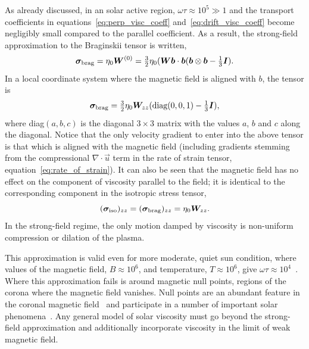 As already discussed, in an solar active region, $\omega \tau \approx 10^5 \gg 1$ and the transport coefficients in equations~\ref{eq:perp_visc_coeff} and~\ref{eq:drift_visc_coeff} become negligibly small compared to the parallel coefficient. As a result, the strong-field approximation to the Braginskii tensor is written,
\begin{equation}
  \label{eq:strong_field_approx}
{\bm \sigma}_{\text{brag}} = \eta_0 {\bm W}^{(0)} = \tfrac{3}{2} \eta_0 ({\bm W} {\bm b} \cdot {\bm b} ( {\bm b} \otimes {\bm b} - \tfrac{1}{3} {\bm I}).
\end{equation}
In a local coordinate system where the magnetic field is aligned with $b$, the tensor is
\begin{equation}
  \label{eq:z_aligned_strong_field_approx}
{\bm \sigma}_{\text{brag}} = \tfrac{3}{2} \eta_0 {\bm W}_{zz} ( \text{diag}(0,0,1) - \tfrac{1}{3} {\bm I}),
\end{equation}
where diag$(a,b,c)$ is the diagonal $3\times3$ matrix with the values $a$, $b$ and $c$ along the diagonal. Notice that the only velocity gradient to enter into the above tensor is that which is aligned with the magnetic field (including gradients stemming from the compressional $\nabla \cdot \vec{u}$ term in the rate of strain tensor, equation~\ref{eq:rate_of_strain}). It can also be seen that the magnetic field has no effect on the component of viscosity parallel to the field; it is identical to the corresponding component in the isotropic stress tensor,
\begin{equation}
  \label{eq:z_aligned_iso}
  ({\bm \sigma}_{\text{iso}})_{zz} = ({\bm \sigma}_{\text{brag}})_{zz} = \eta_0 {\bm W}_{zz}.
\end{equation}
In the strong-field regime, the only motion damped by viscosity is non-uniform compression or dilation of the plasma. 

This approximation is valid even for more moderate, quiet sun condition, where values of the magnetic field, $B\approx 10^6$, and temperature, $T\approx 10^6$, give $\omega\tau \approx 10^4$~\cite{morganGlobalConditionsSolar2017}. Where this approximation fails is around magnetic null points, regions of the corona where the magnetic field vanishes. Null points are an abundant feature in the coronal magnetic field~\cite{edwardsNullPointDistribution2015} and participate in a number of important solar phenomena~\cite{massonNATUREFLARERIBBONS2009,moreno-insertisPLASMAJETSERUPTIONS2013,barnesRelationshipCoronalMagnetic2007}. Any general model of solar viscosity must go beyond the strong-field approximation and additionally incorporate viscosity in the limit of weak magnetic field.

